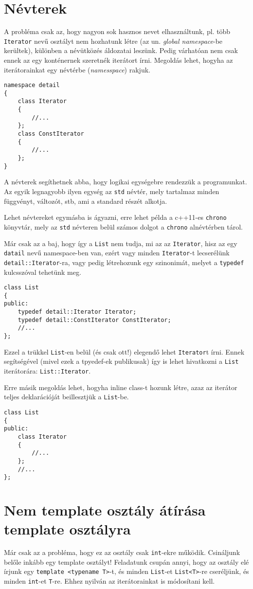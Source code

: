 \documentclass[a4paper,11.5pt]{article}
\begin{document}
	\section{Névterek}
	
	A probléma csak az, hogy nagyon sok hasznos nevet elhasználtunk, pl. több \texttt{Iterator} nevű osztályt nem hozhatunk létre (az un. \textit{global namespace}-be kerültek), különben a névütközés áldozatai leszünk. Pedig várhatóan nem csak ennek az egy konténernek szeretnék iterátort írni. Megoldás lehet, hogyha az iterátorainkat egy névtérbe (\textit{namesspace}) rakjuk.
\begin{lstlisting}
namespace detail
{
	class Iterator
	{
		//...
	};
	class ConstIterator
	{
		//...
	};
}
\end{lstlisting}
	A névterek segíthetnek abba, hogy logikai egységebre rendezzük a programunkat. Az egyik legnagyobb ilyen egység az \texttt{std} névtér, mely tartalmaz minden függvényt, változót, stb, ami a standard részét alkotja. 
	
	Lehet névtereket egymásba is ágyazni, erre lehet példa a c++11-es \texttt{chrono} könyvtár, mely az \texttt{std} névteren belül számos dolgot a \texttt{chrono} alnévtérben tárol.
	
	\medskip
	Már csak az a baj, hogy így a \texttt{List} nem tudja, mi az az \texttt{Iterator}, hisz az egy \texttt{datail} nevű namespace-ben van, ezért vagy minden \texttt{Iterator}-t lecserélünk \texttt{detail::Iterator}-ra, vagy pedig létrehozunk egy szinonimát, melyet a \texttt{typedef} kulcsszóval tehetünk meg.
\begin{lstlisting}
class List
{
public:
	typedef detail::Iterator Iterator;
	typedef detail::ConstIterator ConstIterator;
	//...
};
\end{lstlisting}
	Ezzel a trükkel \texttt{List}-en belül (és csak ott!) elegendő lehet \texttt{Iterator}t írni. Ennek segítségével (mivel ezek a tpyedef-ek publikusak) így is lehet hivatkozni a \texttt{List} iterátorára: \texttt{List::Iterator}.
	
	\medskip
	Erre másik megoldás lehet, hogyha inline class-t hozunk létre, azaz az iterátor teljes deklarációját beillesztjük a \texttt{List}-be.
\begin{lstlisting}
class List
{
public:
	class Iterator
	{
		//...
	};
	//...
};
\end{lstlisting}
	\section{Nem template osztály átírása template osztályra}
	Már csak az a probléma, hogy ez az osztály csak \texttt{int}-ekre működik. Csináljunk belőle inkább egy template osztályt! Feladatunk csupán annyi, hogy az osztály elé írjunk egy \texttt{template <typename T>}-t, és minden \texttt{List}-et \texttt{List<T>}-re cseréljünk, és minden \texttt{int}-et \texttt{T}-re. Ehhez nyilván az iterátorainkat is módosítani kell.
	
\end{document}
